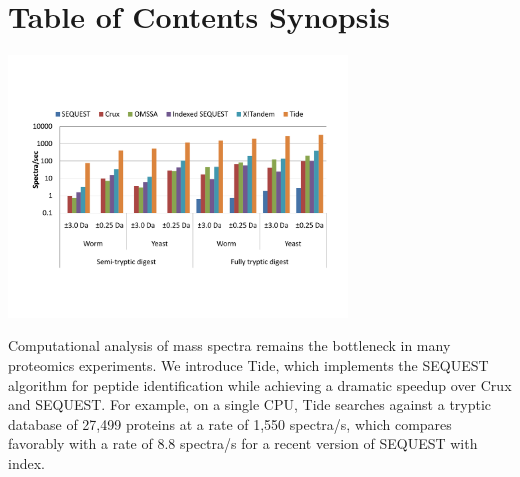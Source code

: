 


\clearpage
\section*{Table of Contents Synopsis}

\centerline{\includegraphics[width=9.0cm]{timing_chart_tocs-cropped.pdf}}

Computational analysis of mass spectra remains the bottleneck in many
proteomics experiments. We introduce Tide, which implements the
SEQUEST algorithm for peptide identification while achieving a
dramatic speedup over Crux and SEQUEST.  For example, on a single CPU,
Tide searches against a tryptic database of 27,499 proteins at a rate
of 1,550 spectra/s, which compares favorably with a rate of 8.8
spectra/s for a recent version of SEQUEST with index.


